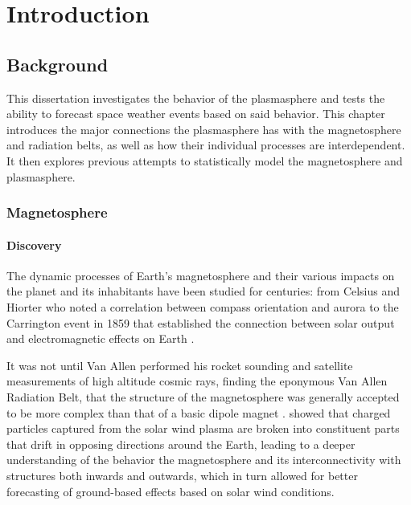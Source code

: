 
\chapter[Introduction]{Introduction}

\section{Background}

This dissertation investigates the behavior of the plasmasphere and tests the ability to forecast space weather events based on said behavior. This chapter introduces the major connections the plasmasphere has with the magnetosphere and radiation belts, as well as how their individual processes are interdependent.  It then explores previous attempts to statistically model the magnetosphere and plasmasphere.

\subsection{Magnetosphere}

\subsubsection{Discovery}
The dynamic processes of Earth's magnetosphere and their various impacts on the planet and its inhabitants have been studied for centuries: from Celsius and Hiorter who noted a correlation between compass orientation and aurora \citep{Maunder} to the Carrington event in 1859 that established the connection between solar output and electromagnetic effects on Earth \citep{Carrington}. 

It was not until Van Allen performed his rocket sounding and satellite measurements of high altitude cosmic rays, finding the eponymous Van Allen Radiation Belt, that the structure of the magnetosphere was generally accepted to be more complex than that of a basic dipole magnet \citep{MagnetoHistory}. \cite{Gold1959RingCurrent} showed that charged particles captured from the solar wind plasma are broken into constituent parts that drift in opposing directions around the Earth, leading to a deeper understanding of the behavior the magnetosphere and its interconnectivity with structures both inwards and outwards, which in turn allowed for better forecasting of ground-based effects based on solar wind conditions.

